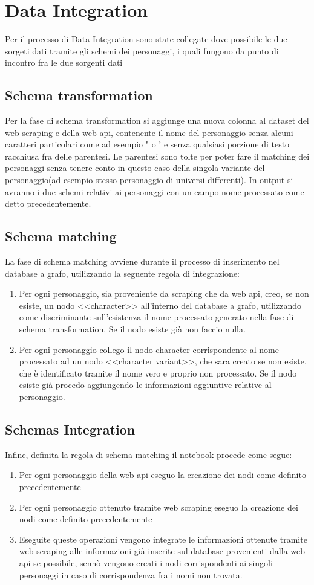 \documentclass[
10pt, %
a4paper, %
oneside, %
headinclude,footinclude, %
BCOR5mm, %
]{scrartcl}
\begin{document}
\section{Data Integration}
Per il processo di Data Integration sono state collegate dove possibile le due sorgeti dati tramite gli schemi dei personaggi, i quali fungono da punto di incontro fra le due sorgenti dati
\subsection{Schema transformation}
Per la fase di schema transformation si aggiunge una nuova colonna al dataset del web scraping e della web api, contenente il nome del personaggio senza alcuni caratteri particolari come ad esempio " o ' e senza qualsiasi porzione di testo racchiusa fra delle parentesi. Le parentesi sono tolte per poter fare il matching dei personaggi senza tenere conto in questo caso della singola variante del personaggio(ad esempio stesso personaggio di universi differenti). In output si avranno i due schemi relativi ai personaggi con un campo nome processato come detto precedentemente.
\subsection{Schema matching}
La fase di schema matching avviene durante il processo di inserimento nel database a grafo, utilizzando la seguente regola di integrazione:
\begin{enumerate}
	\item Per ogni personaggio, sia proveniente da scraping che da web api, creo, se non esiste, un nodo <<character>> all'interno del database a grafo, utilizzando come discriminante sull'esistenza il nome processato generato nella fase di schema transformation. Se il nodo esiste già non faccio nulla.
	\item Per ogni personaggio collego il nodo character corrispondente al nome processato ad un nodo <<character variant>>, che sara creato se non esiste, che è identificato tramite il nome vero e proprio non processato. Se il nodo esiste già procedo aggiungendo le informazioni aggiuntive relative al personaggio. 	
\end{enumerate}
\subsection{Schemas Integration}
Infine, definita la regola di schema matching il notebook procede come segue:
\begin{enumerate}
	\item Per ogni personaggio della web api eseguo la creazione dei nodi come definito precedentemente
	\item Per ogni personaggio ottenuto tramite web scraping eseguo la creazione dei nodi come definito precedentemente
	\item Eseguite queste operazioni vengono integrate le informazioni ottenute tramite web scraping alle informazioni già inserite sul database provenienti dalla web api se possibile, sennò vengono creati i nodi corrispondenti ai singoli personaggi in caso di corrispondenza fra i nomi non trovata.
\end{enumerate}
\end{document}
